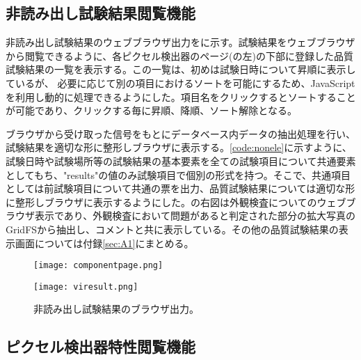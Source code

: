 \subsection{非読み出し試験結果閲覧機能}
\label{sec:non-elec-view}

非読み出し試験結果のウェブブラウザ出力をに示す。試験結果をウェブブラウザから閲覧できるように、各ピクセル検出器のページ(の左)の下部に登録した品質試験結果の一覧を表示する。この一覧は、初めは試験日時について昇順に表示しているが、
必要に応じて別の項目におけるソートを可能にするため、JavaScriptを利用し動的に処理できるようにした。項目名をクリックするとソートすることが可能であり、クリックする毎に昇順、降順、ソート解除となる。

ブラウザから受け取った信号をもとにデータベース内データの抽出処理を行い、試験結果を適切な形に整形しブラウザに表示する。\cref{code:nonele}に示すように、試験日時や試験場所等の試験結果の基本要素を全ての試験項目について共通要素としてもち、"results"の値のみ試験項目で個別の形式を持つ。そこで、共通項目としては前試験項目について共通の票を出力、品質試験結果については適切な形に整形しブラウザに表示するようにした。の右図は外観検査についてのウェブブラウザ表示であり、外観検査において問題があると判定された部分の拡大写真のGridFSから抽出し、コメントと共に表示している。その他の品質試験結果の表示画面については付録\ref{sec:A1}にまとめる。

\begin{figure}[tbp]
  \begin{minipage}[b]{0.45\linewidth}
    \centering
    \texttt{[image: componentpage.png]}
  \end{minipage}
  \begin{minipage}[b]{0.45\linewidth}
    \centering
    \texttt{[image: viresult.png]}
  \end{minipage}
    \caption{非読み出し試験結果のブラウザ出力。}
    \label{fig:noneleresult}
\end{figure}

\subsection{ピクセル検出器特性閲覧機能}
\label{sec:prop-view}

